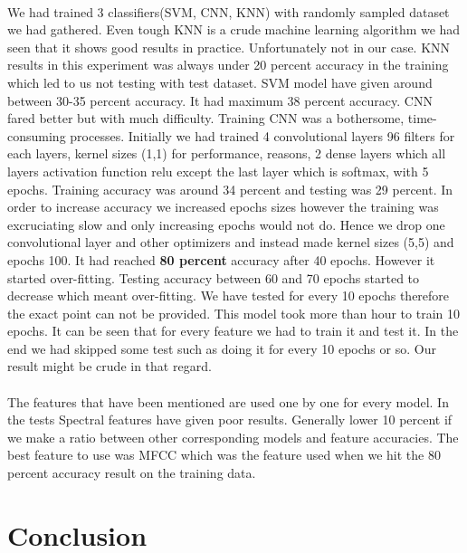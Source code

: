 \documentclass[10pt,twocolumn,letterpaper]{article}
\begin{document}
  \paragraph{} We had trained 3 classifiers(SVM, CNN, KNN) with randomly sampled dataset we had gathered. Even tough KNN is a crude machine learning algorithm we had seen that it shows good results in practice. Unfortunately not in our case. KNN results in this experiment was always under 20 percent accuracy in the training which led to us not testing with test dataset. SVM model have given around between 30-35 percent accuracy. It had maximum 38 percent accuracy. CNN fared better but with much difficulty. Training CNN was a bothersome, time-consuming processes. Initially we had trained 4 convolutional layers 96 filters for each layers, kernel sizes (1,1) for performance,   reasons, 2 dense layers which all layers activation function relu except the last layer which is softmax, with 5 epochs. Training accuracy was around 34 percent and testing was 29 percent. In order to increase accuracy we increased epochs sizes however the training was excruciating slow and only increasing epochs would not do. Hence we drop one convolutional layer and other optimizers and instead made kernel sizes (5,5) and epochs 100. It had reached \textbf{80 percent} accuracy after 40 epochs. However it started over-fitting. Testing accuracy between 60 and 70 epochs started to decrease which meant over-fitting. We have tested for every 10 epochs therefore the exact point can not be provided. This model took more than hour to train 10 epochs. It can be seen that for every feature we had to train it and test it. In the end we had skipped some test such as doing it for every 10 epochs or so. Our result might be crude in that regard.    
 
  \paragraph{} The features that have been mentioned are used one by one for every model. In the tests Spectral features have given poor results. Generally lower 10 percent if we make a ratio between other corresponding models and feature accuracies. The best feature to use was MFCC which was the feature used when we hit the 80 percent accuracy result on the training data.

  \section{Conclusion}
\end{document}
